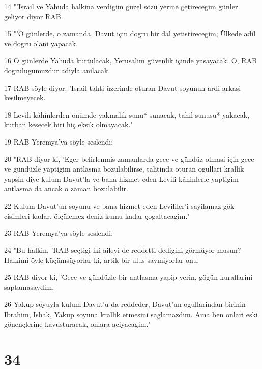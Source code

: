 \par 14 "'Israil ve Yahuda halkina verdigim güzel sözü yerine getirecegim günler geliyor diyor RAB.
\par 15 "'O günlerde, o zamanda, Davut için dogru bir dal yetistirecegim; Ülkede adil ve dogru olani yapacak.
\par 16 O günlerde Yahuda kurtulacak, Yerusalim güvenlik içinde yasayacak. O, RAB dogrulugumuzdur adiyla anilacak.
\par 17 RAB söyle diyor: 'Israil tahti üzerinde oturan Davut soyunun ardi arkasi kesilmeyecek.
\par 18 Levili kâhinlerden önümde yakmalik sunu* sunacak, tahil sunusu* yakacak, kurban kesecek biri hiç eksik olmayacak."
\par 19 RAB Yeremya'ya söyle seslendi:
\par 20 "RAB diyor ki, 'Eger belirlenmis zamanlarda gece ve gündüz olmasi için gece ve gündüzle yaptigim antlasma bozulabilirse, tahtinda oturan ogullari krallik yapsin diye kulum Davut'la ve bana hizmet eden Levili kâhinlerle yaptigim antlasma da ancak o zaman bozulabilir.
\par 22 Kulum Davut'un soyunu ve bana hizmet eden Levililer'i sayilamaz gök cisimleri kadar, ölçülemez deniz kumu kadar çogaltacagim."
\par 23 RAB Yeremya'ya söyle seslendi:
\par 24 "Bu halkin, 'RAB seçtigi iki aileyi de reddetti dedigini görmüyor musun? Halkimi öyle küçümsüyorlar ki, artik bir ulus saymiyorlar onu.
\par 25 RAB diyor ki, 'Gece ve gündüzle bir antlasma yapip yerin, gögün kurallarini saptamasaydim,
\par 26 Yakup soyuyla kulum Davut'u da reddeder, Davut'un ogullarindan birinin Ibrahim, Ishak, Yakup soyuna krallik etmesini saglamazdim. Ama ben onlari eski gönençlerine kavusturacak, onlara aciyacagim."

\chapter{34}

